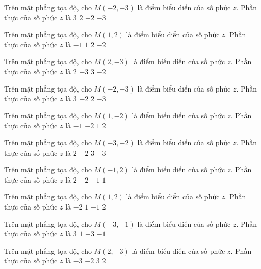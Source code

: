 \begin{ex}
 Trên mặt phẳng tọa độ, cho $M(-2,-3)$ là điểm biểu diển của số phức $z$. Phần thực của số phức $z$ là
\choice
{$3$}
{$2$}
{\True $-2$}
{$-3$}
\end{ex}
\begin{ex}
 Trên mặt phẳng tọa độ, cho $M(1,2)$ là điểm biểu diển của số phức $z$. Phần thực của số phức $z$ là
\choice
{$-1$}
{\True $1$}
{$2$}
{$-2$}
\end{ex}
\begin{ex}
 Trên mặt phẳng tọa độ, cho $M(2,-3)$ là điểm biểu diển của số phức $z$. Phần thực của số phức $z$ là
\choice
{\True $2$}
{$-3$}
{$3$}
{$-2$}
\end{ex}
\begin{ex}
 Trên mặt phẳng tọa độ, cho $M(-2,-3)$ là điểm biểu diển của số phức $z$. Phần thực của số phức $z$ là
\choice
{$3$}
{\True $-2$}
{$2$}
{$-3$}
\end{ex}
\begin{ex}
 Trên mặt phẳng tọa độ, cho $M(1,-2)$ là điểm biểu diển của số phức $z$. Phần thực của số phức $z$ là
\choice
{$-1$}
{$-2$}
{\True $1$}
{$2$}
\end{ex}
\begin{ex}
 Trên mặt phẳng tọa độ, cho $M(-3,-2)$ là điểm biểu diển của số phức $z$. Phần thực của số phức $z$ là
\choice
{$2$}
{$-2$}
{$3$}
{\True $-3$}
\end{ex}
\begin{ex}
 Trên mặt phẳng tọa độ, cho $M(-1,2)$ là điểm biểu diển của số phức $z$. Phần thực của số phức $z$ là
\choice
{$2$}
{$-2$}
{\True $-1$}
{$1$}
\end{ex}
\begin{ex}
 Trên mặt phẳng tọa độ, cho $M(1,2)$ là điểm biểu diển của số phức $z$. Phần thực của số phức $z$ là
\choice
{$-2$}
{\True $1$}
{$-1$}
{$2$}
\end{ex}
\begin{ex}
 Trên mặt phẳng tọa độ, cho $M(-3,-1)$ là điểm biểu diển của số phức $z$. Phần thực của số phức $z$ là
\choice
{$3$}
{$1$}
{\True $-3$}
{$-1$}
\end{ex}
\begin{ex}
 Trên mặt phẳng tọa độ, cho $M(2,-3)$ là điểm biểu diển của số phức $z$. Phần thực của số phức $z$ là
\choice
{$-3$}
{$-2$}
{$3$}
{\True $2$}
\end{ex}
